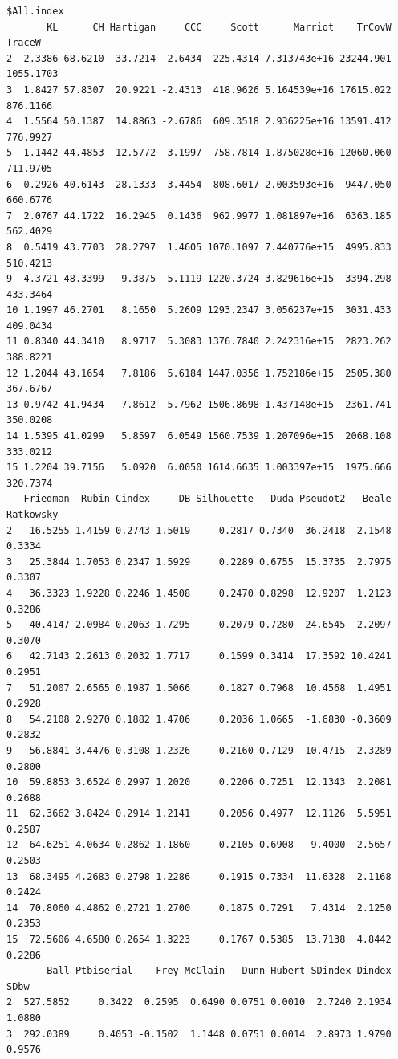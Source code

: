 \documentclass[
]{article}
\begin{document}
\begin{verbatim}
$All.index
       KL      CH Hartigan     CCC     Scott      Marriot    TrCovW    TraceW
2  2.3386 68.6210  33.7214 -2.6434  225.4314 7.313743e+16 23244.901 1055.1703
3  1.8427 57.8307  20.9221 -2.4313  418.9626 5.164539e+16 17615.022  876.1166
4  1.5564 50.1387  14.8863 -2.6786  609.3518 2.936225e+16 13591.412  776.9927
5  1.1442 44.4853  12.5772 -3.1997  758.7814 1.875028e+16 12060.060  711.9705
6  0.2926 40.6143  28.1333 -3.4454  808.6017 2.003593e+16  9447.050  660.6776
7  2.0767 44.1722  16.2945  0.1436  962.9977 1.081897e+16  6363.185  562.4029
8  0.5419 43.7703  28.2797  1.4605 1070.1097 7.440776e+15  4995.833  510.4213
9  4.3721 48.3399   9.3875  5.1119 1220.3724 3.829616e+15  3394.298  433.3464
10 1.1997 46.2701   8.1650  5.2609 1293.2347 3.056237e+15  3031.433  409.0434
11 0.8340 44.3410   8.9717  5.3083 1376.7840 2.242316e+15  2823.262  388.8221
12 1.2044 43.1654   7.8186  5.6184 1447.0356 1.752186e+15  2505.380  367.6767
13 0.9742 41.9434   7.8612  5.7962 1506.8698 1.437148e+15  2361.741  350.0208
14 1.5395 41.0299   5.8597  6.0549 1560.7539 1.207096e+15  2068.108  333.0212
15 1.2204 39.7156   5.0920  6.0050 1614.6635 1.003397e+15  1975.666  320.7374
   Friedman  Rubin Cindex     DB Silhouette   Duda Pseudot2   Beale Ratkowsky
2   16.5255 1.4159 0.2743 1.5019     0.2817 0.7340  36.2418  2.1548    0.3334
3   25.3844 1.7053 0.2347 1.5929     0.2289 0.6755  15.3735  2.7975    0.3307
4   36.3323 1.9228 0.2246 1.4508     0.2470 0.8298  12.9207  1.2123    0.3286
5   40.4147 2.0984 0.2063 1.7295     0.2079 0.7280  24.6545  2.2097    0.3070
6   42.7143 2.2613 0.2032 1.7717     0.1599 0.3414  17.3592 10.4241    0.2951
7   51.2007 2.6565 0.1987 1.5066     0.1827 0.7968  10.4568  1.4951    0.2928
8   54.2108 2.9270 0.1882 1.4706     0.2036 1.0665  -1.6830 -0.3609    0.2832
9   56.8841 3.4476 0.3108 1.2326     0.2160 0.7129  10.4715  2.3289    0.2800
10  59.8853 3.6524 0.2997 1.2020     0.2206 0.7251  12.1343  2.2081    0.2688
11  62.3662 3.8424 0.2914 1.2141     0.2056 0.4977  12.1126  5.5951    0.2587
12  64.6251 4.0634 0.2862 1.1860     0.2105 0.6908   9.4000  2.5657    0.2503
13  68.3495 4.2683 0.2798 1.2286     0.1915 0.7334  11.6328  2.1168    0.2424
14  70.8060 4.4862 0.2721 1.2700     0.1875 0.7291   7.4314  2.1250    0.2353
15  72.5606 4.6580 0.2654 1.3223     0.1767 0.5385  13.7138  4.8442    0.2286
       Ball Ptbiserial    Frey McClain   Dunn Hubert SDindex Dindex   SDbw
2  527.5852     0.3422  0.2595  0.6490 0.0751 0.0010  2.7240 2.1934 1.0880
3  292.0389     0.4053 -0.1502  1.1448 0.0751 0.0014  2.8973 1.9790 0.9576

\end{verbatim}
\end{document}
